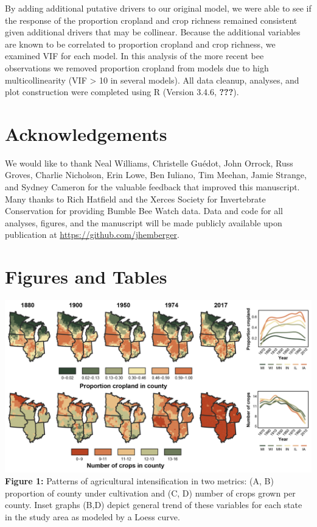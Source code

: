 \documentclass[11pt,]{article}
\begin{document}
By adding additional putative drivers to our original model, we were
able to see if the response of the proportion cropland and crop richness
remained consistent given additional drivers that may be collinear.
Because the additional variables are known to be correlated to
proportion cropland and crop richness, we examined VIF for each model.
In this analysis of the more recent bee observations we removed
proportion cropland from models due to high multicollinearity (VIF
\textgreater{} 10 in several models). All data cleanup, analyses, and
plot construction were completed using R (Version 3.4.6,
{\textbf{???}}).

\hypertarget{acknowledgements}{%
\section{Acknowledgements}\label{acknowledgements}}

We would like to thank Neal Williams, Christelle Guédot, John Orrock,
Russ Groves, Charlie Nicholson, Erin Lowe, Ben Iuliano, Tim Meehan,
Jamie Strange, and Sydney Cameron for the valuable feedback that
improved this manuscript. Many thanks to Rich Hatfield and the Xerces
Society for Invertebrate Conservation for providing Bumble Bee Watch
data. Data and code for all analyses, figures, and the manuscript will
be made publicly available upon publication at
\url{https://github.com/jhemberger}. \clearpage

\newpage

\hypertarget{figures-and-tables}{%
\section{Figures and Tables}\label{figures-and-tables}}

\includegraphics[width=1\textwidth,height=\textheight]{../ms_figs/fig_1.png}
\textbf{Figure 1:} Patterns of agricultural intensification in two
metrics: (A, B) proportion of county under cultivation and (C, D) number
of crops grown per county. Inset graphs (B,D) depict general trend of
these variables for each state in the study area as modeled by a Loess
curve. \clearpage
\end{document}
